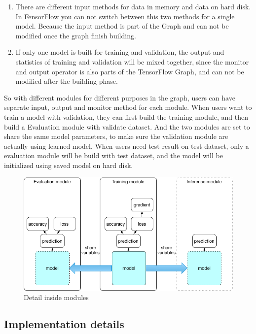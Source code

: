 \begin{enumerate}
   \item There are different input methods for data in memory and data on hard disk. In FensorFlow you can not switch between this two methods for a single model. Because the input method is part of the Graph and can not be modified once the graph finish building.
   \item If only one model is built for training and validation, the output and statistics of training and validation will be mixed together, since the monitor and output operator is also parts of the TensorFlow Graph, and can not be modified after the building phase. 
   
\end{enumerate}
So with different modules for different purposes in the graph, users can have separate input, output and monitor method for each module. When users want to train a model with validation, they can first build the training module, and then build a Evaluation module with validate dataset. And the two modules are set to share the same model parameters, to make sure the validation module are actually using learned model. When users need test result on test dataset, only a evaluation module will be build with test dataset, and the model will be initialized using saved model on hard disk.
\begin{figure}[H] 
	\centering
	\includegraphics[width=5in]{Figures/system_detail}
	\caption[Detail inside modules]{Detail inside modules}
	\label{fig:system_detail}
\end{figure}

\subsection{Implementation details}
